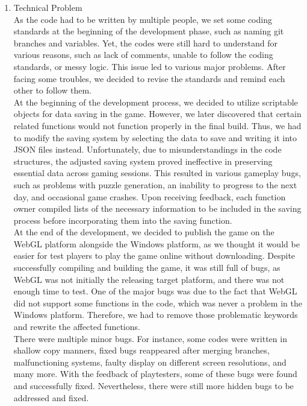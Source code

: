 \documentclass[12pt,oneside,openright,a4paper]{cpe-english-project}
\begin{document}
\begin{enumerate}
	\item Technical Problem \\
	As the code had to be written by multiple people, we set some coding standards at the beginning of the development phase, such as naming git branches and variables. Yet, the codes were still hard to understand for various reasons, such as lack of comments, unable to follow the coding standards, or messy logic. This issue led to various major problems. After facing some troubles, we decided to revise the standards and remind each other to follow them. \\
	At the beginning of the development process, we decided to utilize scriptable objects for data saving in the game. However, we later discovered that certain related functions would not function properly in the final build. Thus, we had to modify the saving system by selecting the data to save and writing it into JSON files instead. Unfortunately, due to misunderstandings in the code structures, the adjusted saving system proved ineffective in preserving essential data across gaming sessions. This resulted in various gameplay bugs, such as problems with puzzle generation, an inability to progress to the next day, and occasional game crashes. Upon receiving feedback, each function owner compiled lists of the necessary information to be included in the saving process before incorporating them into the saving function. \\
	At the end of the development, we decided to publish the game on the WebGL platform alongside the Windows platform, as we thought it would be easier for test players to play the game online without downloading. Despite successfully compiling and building the game, it was still full of bugs, as WebGL was not initially the releasing target platform, and there was not enough time to test. One of the major bugs was due to the fact that WebGL did not support some functions in the code, which was never a problem in the Windows platform. Therefore, we had to remove those problematic keywords and rewrite the affected functions. \\
	There were multiple minor bugs. For instance, some codes were written in shallow copy manners, fixed bugs reappeared after merging branches, malfunctioning systems, faulty display on different screen resolutions, and many more. With the feedback of playtesters, some of these bugs were found and successfully fixed. Nevertheless, there were still more hidden bugs to be addressed and fixed.
\end{enumerate}
\end{document}
